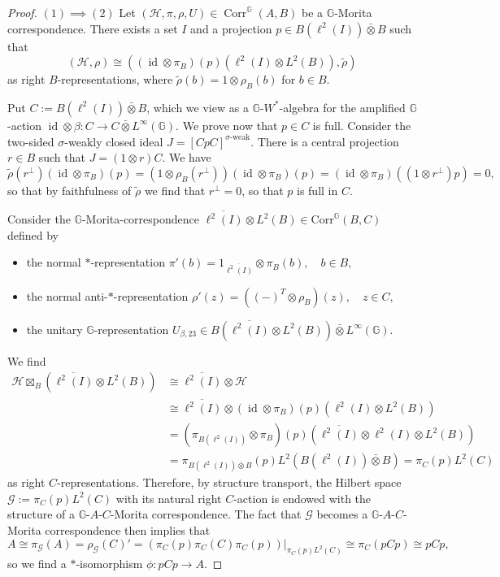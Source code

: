 \documentclass[10pt,a4paper]{amsart}
\DeclareMathOperator{\id}{\mathrm{id}}
\newcommand{\Corr}{\mathrm{Corr}}
\newcommand{\G}{\mathbb{G}}
\newcommand{\ovot}{\bar{\otimes}}
\begin{document}
\begin{proof} $(1)\implies (2)$ Let $(\mathcal{H}, \pi, \rho, U)\in \operatorname{Corr}^\G(A,B)$ be a $\G$-Morita correspondence. There exists a set $I$ and a projection $p\in B(\ell^2(I))\ovot B$ such that 
$$(\mathcal{H}, \rho)\cong ((\id \otimes \pi_B)(p)(\ell^2(I)\otimes L^2(B)), \tilde{\rho})$$
as right $B$-representations, where $\tilde{\rho}(b) = 1\otimes \rho_B(b)$ for $b\in B$.

Put $C:= B(\ell^2(I))\ovot B$, which we view as a $\G$-$W^*$-algebra for the amplified $\G$-action $\id \otimes \beta: C \to C \ovot L^\infty(\G)$. We prove now that $p\in C$ is full. Consider the two-sided $\sigma$-weakly closed ideal
$J = [CpC]^{\sigma\text{-weak}}.$
There is a central projection $r\in B$ such that $J = (1\otimes r)C$. We have
$$\tilde{\rho}(r^\perp)(\id \otimes \pi_B)(p)= (1\otimes \rho_B(r^\perp))(\id \otimes \pi_B)(p)= (\id \otimes \pi_B)((1\otimes r^\perp)p)= 0,$$
so that by faithfulness of $\tilde{\rho}$ we find that $r^\perp= 0$, so that $p$ is full in $C$.

Consider the $\G$-Morita-correspondence $\overline{\ell^2(I)}\otimes L^2(B)\in \Corr^\G(B,C)$ defined by
    \begin{itemize}\setlength\itemsep{-0.5em}
        \item the normal $*$-representation $\pi'(b) = 1_{\overline{\ell^2(I)}}\otimes \pi_B(b), \quad b \in B,$
        \item the normal anti-$*$-representation $\rho'(z) = ({(-)}^T \otimes \rho_B)(z), \quad z \in C,$
        \item the unitary $\G$-representation $U_{\beta, 23}\in B(\overline{\ell^2(I)}\otimes L^2(B))\ovot L^\infty(\G)$.
    \end{itemize}
We find
\begin{align*}
    \mathcal{H}\boxtimes_B (\overline{\ell^2(I)}\otimes L^2(B)) &\cong \overline{\ell^2(I)}\otimes \mathcal{H}\\
    &\cong \overline{\ell^2(I)}\otimes (\id \otimes \pi_B)(p)(\ell^2(I)\otimes L^2(B))\\
    &= (\pi_{B(\ell^2(I))}\otimes \pi_B)(p)(\overline{\ell^2(I)}\otimes \ell^2(I)\otimes L^2(B))\\
    &= \pi_{B(\ell^2(I))\ovot B}(p)L^2(B(\ell^2(I))\ovot B) = \pi_C(p)L^2(C)
\end{align*}
as right $C$-representations. Therefore, by structure transport, the Hilbert space $\mathcal{G}:=\pi_C(p)L^2(C)$ with its natural right $C$-action is endowed with the structure of a $\G$-$A$-$C$-Morita correspondence. The fact that $\mathcal{G}$ becomes a $\G$-$A$-$C$-Morita correspondence then implies that 
$$A \cong \pi_\mathcal{G}(A)= \rho_\mathcal{G}(C)' = (\pi_C(p) \pi_C(C) \pi_C(p))\vert_{\pi_C(p)L^2(C)}\cong \pi_C(pCp)\cong pCp,$$
so we find a $*$-isomorphism $\phi: pCp \to A$.


\end{proof}
\end{document}

